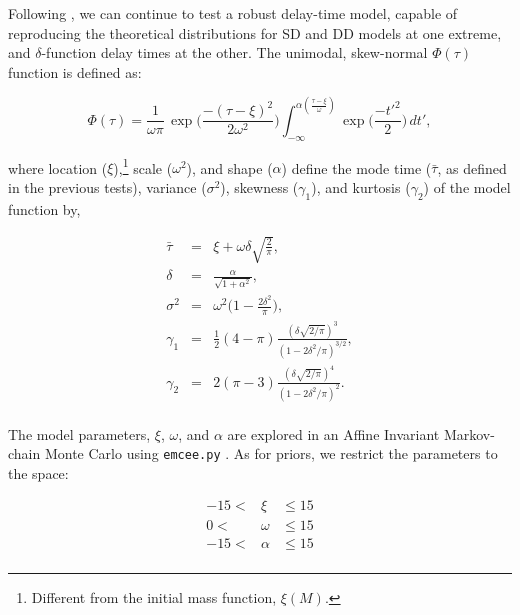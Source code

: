 \documentclass[apj]{aastex}
\begin{document}
Following \cite{Strolger:2010}, we can continue to test a robust delay-time model, capable of reproducing the theoretical distributions for SD and DD models at one extreme, and $\delta$-function delay times at the other. The unimodal, skew-normal $\Phi(\tau)$ function is defined as:

\begin{equation}
	\Phi(\tau)=\frac{1}{\omega\pi}\,\exp\biggl(\frac{-(\tau-\xi)^2}{2\omega^2}\biggr)\int_{-\infty}^{\alpha (\frac{\tau-\xi}{\omega})} \exp\biggl(\frac{-t'^2}{2}\biggr)\,dt',
\label{eqn:model}
\end{equation}

\noindent where location ($\xi$),\footnote{Different from the initial mass function, $\xi(M)$.} scale ($\omega^2$), and shape ($\alpha$) define the mode time ($\bar{\tau}$, as defined in the previous tests), variance ($\sigma^2$), skewness ($\gamma_1$), and kurtosis ($\gamma_2$) of the model function by,

\begin{eqnarray*}
 \bar{\tau}&=&\xi+\omega\delta\sqrt{\frac{2}{\pi}},\\
 \delta&=&\frac{\alpha}{\sqrt{1+\alpha^2}},\\
 \sigma^2&=&\omega^2\biggl(1-\frac{2\delta^2}{\pi}\biggr),\\
\gamma_1&=&\frac{1}{2}(4-\pi)\frac{(\delta\sqrt{2/\pi})^3}{(1-2\delta^2/\pi)^{3/2}},\\
\gamma_2&=&2(\pi-3)\frac{(\delta\sqrt{2/\pi})^4}{(1-2\delta^2/\pi)^{2}}.\\
\end{eqnarray*}

The model parameters, $\xi$, $\omega$, and $\alpha$ are explored in an Affine Invariant Markov-chain Monte Carlo using {\tt emcee.py} \citep{Foreman-Mackey:2013pd}. As for priors, we restrict the parameters to the space:

\begin{eqnarray*}
-15 <&  \xi &\le 15\\
0 <&\omega &\le 15\\
-15 <&  \alpha &\le 15\\
\end{eqnarray*}
\end{document}
